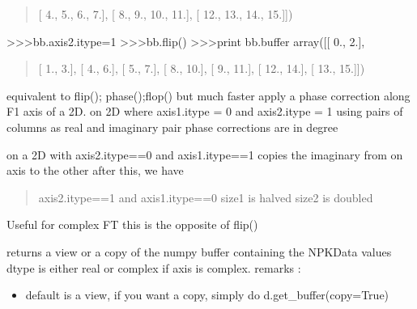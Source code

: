 \documentclass[letterpaper,10pt,openany,oneside]{sphinxmanual}
\begin{document}
\begin{fulllineitems}
\begin{fulllineitems}
\begin{quote}
{[}  4.,   5.,   6.,   7.{]},
{[}  8.,   9.,  10.,  11.{]},
{[} 12.,  13.,  14.,  15.{]}{]})
\end{quote}

\textgreater{}\textgreater{}\textgreater{}bb.axis2.itype=1
\textgreater{}\textgreater{}\textgreater{}bb.flip()
\textgreater{}\textgreater{}\textgreater{}print bb.buffer
array({[}{[}  0.,   2.{]},
\begin{quote}

{[}  1.,   3.{]},
{[}  4.,   6.{]},
{[}  5.,   7.{]},
{[}  8.,  10.{]},
{[}  9.,  11.{]},
{[} 12.,  14.{]},
{[} 13.,  15.{]}{]})
\end{quote}

\end{fulllineitems}


\begin{fulllineitems}
\label{rst/code:NPKData.NPKData.flipphase}
equivalent to   flip(); phase();flop()   but much faster
apply a phase correction along F1 axis of a 2D.
on 2D where axis1.itype = 0   and   axis2.itype = 1
using pairs of columns as real and imaginary pair
phase corrections are in degree

\end{fulllineitems}


\begin{fulllineitems}
\label{rst/code:NPKData.NPKData.flop}
on a 2D with axis2.itype==0 and axis1.itype==1
copies the imaginary from on axis to the other
after this, we have
\begin{quote}

axis2.itype==1 and axis1.itype==0
size1 is halved
size2 is doubled
\end{quote}

Useful for complex FT
this is the opposite of flip()

\end{fulllineitems}


\begin{fulllineitems}
\label{rst/code:NPKData.NPKData.get_buffer}
returns a view or a copy of the numpy buffer containing the NPKData values
dtype is either real or complex if axis is complex.
remarks :
\begin{itemize}
\item {} 
default is a view, if you want a copy, simply do d.get\_buffer(copy=True)


\end{itemize}
\end{fulllineitems}
\end{fulllineitems}
\end{document}
